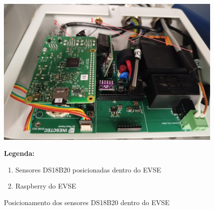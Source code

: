 \begin{figure}[H]
    \centering
    \begin{minipage}{0.6\textwidth}
        \includegraphics[width=\linewidth]{figures/inst_inside_2.png}
    \end{minipage}%
    \hfill
    \begin{minipage}{0.35\textwidth}
        \small
        \textbf{Legenda:}
        \begin{enumerate}
            \item Sensores DS18B20 posicionadas dentro do EVSE
            \item Raspberry do EVSE
        \end{enumerate}
    \end{minipage}
    \caption{Posicionamento dos sensores DS18B20 dentro do EVSE}
    \label{fig:inst_inside_2}
\end{figure}

